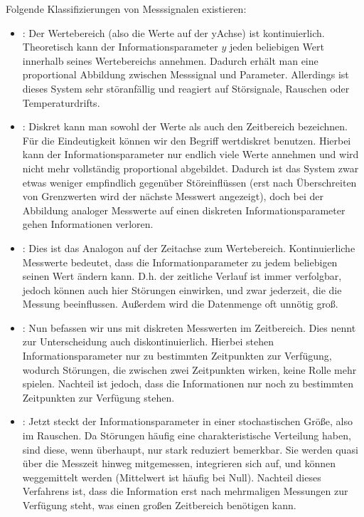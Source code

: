 \documentclass[letterpaper,10pt,english]{jupyterBook}
\begin{document}
\sphinxAtStartPar
Folgende Klassifizierungen von Messsignalen existieren:
\begin{itemize}
\item {} 
\sphinxAtStartPar
{}: Der Wertebereich (also die Werte auf der y\sphinxhyphen{}Achse) ist kontinuierlich. Theoretisch kann der Informationsparameter \(y\) jeden beliebigen Wert innerhalb seines Wertebereichs annehmen. Dadurch erhält man eine proportional Abbildung zwischen Messsignal und Parameter. Allerdings ist dieses System sehr störanfällig und reagiert auf Störsignale, Rauschen oder Temperaturdrifts.

\item {} 
\sphinxAtStartPar
{}: Diskret kann man sowohl der Werte\sphinxhyphen{} als auch den Zeitbereich bezeichnen. Für die Eindeutigkeit können wir den Begriff wertdiskret benutzen. Hierbei kann der Informationsparameter nur endlich viele Werte annehmen und wird nicht mehr vollständig proportional abgebildet. Dadurch ist das System zwar etwas weniger empfindlich gegenüber Störeinflüssen (erst nach Überschreiten von Grenzwerten wird der nächste  Messwert angezeigt), doch bei der Abbildung analoger Messwerte auf einen diskreten Informationsparameter gehen Informationen verloren.

\item {} 
\sphinxAtStartPar
{}: Dies ist das Analogon auf der Zeitachse zum  Wertebereich. Kontinuierliche Messwerte bedeutet, dass die Informationparameter zu jedem beliebigen  seinen Wert ändern kann. D.h. der zeitliche Verlauf ist immer verfolgbar, jedoch können auch hier Störungen einwirken, und zwar jederzeit, die die Messung beeinflussen. Außerdem wird die Datenmenge oft unnötig groß.

\item {} 
\sphinxAtStartPar
{}: Nun befassen wir uns mit diskreten Messwerten im Zeitbereich. Dies nennt zur Unterscheidung auch diskontinuierlich. Hierbei stehen Informationsparameter nur zu bestimmten Zeitpunkten zur Verfügung, wodurch Störungen, die zwischen zwei Zeitpunkten wirken, keine Rolle mehr spielen. Nachteil ist jedoch, dass die Informationen nur noch zu bestimmten Zeitpunkten zur Verfügung stehen.

\item {} 
\sphinxAtStartPar
{}: Jetzt steckt der Informationsparameter in einer stochastischen Größe, also im Rauschen. Da Störungen häufig eine charakteristische Verteilung haben, sind diese, wenn überhaupt, nur stark reduziert bemerkbar. Sie werden quasi über die Messzeit hinweg mitgemessen, integrieren sich auf, und können weggemittelt werden (Mittelwert ist häufig bei Null). Nachteil dieses Verfahrens ist, dass die Information erst nach mehrmaligen Messungen zur Verfügung steht, was einen großen Zeitbereich benötigen kann.


\end{itemize}
\end{document}
